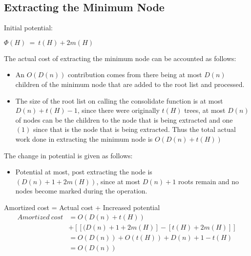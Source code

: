 \subsection{Extracting the Minimum Node}
Initial potential:
\begin{center}
	$\Phi{(H)} \ = \ t(H) + 2m(H)$
\end{center}
The actual cost of extracting the minimum node can be accounted as follows: 
\begin{itemize}
	\item An $O(D(n))$ contribution comes from there being at most $D(n)$ children of the minimum node that are added to the root list and processed.\\
	\item The size of the root list on calling the consolidate function is at most $D(n)+t(H)-1$, since there were originally $t(H)$ trees, at most $D(n)$ of nodes can be the children to the node that is being extracted and one $(1)$ since that is the node that is being extracted. Thus the total actual work done in extracting the minimum node is $O(D(n)+t(H))$
\end{itemize}
The change in potential is given as follows:
\begin{itemize}
	\item Potential at most, post extracting the node is \\ $(D(n)+1 + 2m(H))$, since at most $D(n)+1$ roots remain and no nodes become marked during the operation.
\end{itemize}
Amortized cost = Actual cost + Increased potential
\begin{equation}
\begin{split}
Amortized \ cost &= O(D(n)+t(H)) \\
& + [ [(D(n)+1+2m(H)] - [t(H)+2m(H)] ]
\\&= O(D(n)) + O(t(H)) + D(n) + 1 -t(H)
\\&= O(D(n))
\end{split}
\end{equation}
